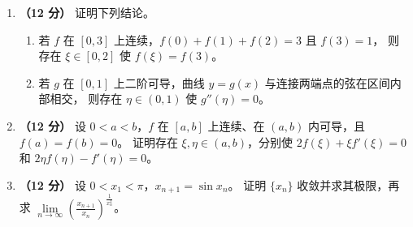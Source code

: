 \documentclass[UTF8,a4paper,zihao=-4,fontset=fandol]{ctexart}
\renewcommand{\lim}{\operatorname*{lim}\limits}
\begin{document}
\newpage
\begin{enumerate}[start=20]
\item \textbf{（12 分）} 证明下列结论。
\begin{enumerate}[label=(\arabic*),nosep]
\item 若 $f$ 在 $[0,3]$ 上连续，$f(0)+f(1)+f(2)=3$ 且 $f(3)=1$，
则存在 $\xi\in[0,2]$ 使 $f(\xi)=f(3)$。
\item 若 $g$ 在 $[0,1]$ 上二阶可导，曲线 $y=g(x)$ 与连接两端点的弦在区间内部相交，
则存在 $\eta\in(0,1)$ 使 $g''(\eta)=0$。
\end{enumerate}
\vspace{5.5cm}
\item \textbf{（12 分）} 设 $0<a<b$，$f$ 在 $[a,b]$ 上连续、在 $(a,b)$ 内可导，且 $f(a)=f(b)=0$。
证明存在 $\xi,\eta\in(a,b)$，分别使
$2f(\xi)+\xi f'(\xi)=0$ 和 $2\eta f(\eta)-f'(\eta)=0$。
\vspace{5.5cm}
\item \textbf{（12 分）} 设 $0<x_1<\pi$，$x_{n+1}=\sin x_n$。
证明 $\{x_n\}$ 收敛并求其极限，再求
$\displaystyle\lim_{n\to\infty}(\frac{x_{n+1}}{x_n})^{\frac{1}{x_n^2}}$。
\end{enumerate}
\end{document}
